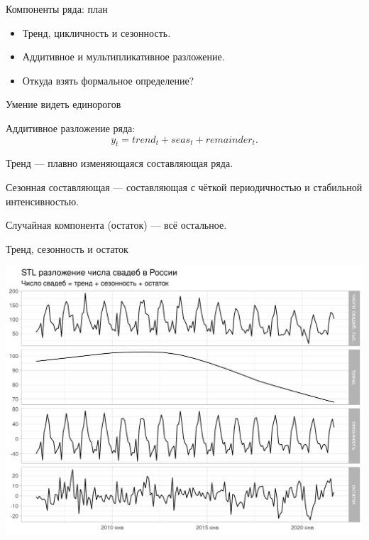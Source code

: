 
\begin{frame} %


\end{frame}



\begin{frame}{Компоненты ряда: план}
  \begin{itemize}[<+->]
    \item Тренд, цикличность и сезонность.
    \item Аддитивное и мультипликативное разложение.
    \item Откуда взять формальное определение?
  \end{itemize}

\end{frame}


\begin{frame}{Умение видеть единорогов}

Аддитивное разложение ряда:
\[
y_t = trend_t + seas_t + remainder_t.
\]

\pause

\alert{Тренд} — плавно изменяющаяся составляющая ряда.

\pause

\alert{Сезонная составляющая} — составляющая с чёткой периодичностью и стабильной интенсивностью.

\pause

\alert{Случайная компонента} (остаток) — всё остальное. 

\end{frame}

\begin{frame}{Тренд, сезонность и остаток}

  \includegraphics[width=\textwidth]{pictures/om_ts_01-041.png}

\end{frame}

